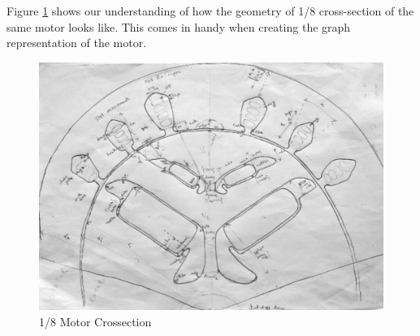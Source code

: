 \documentclass{report} %
\begin{document}
Figure \ref{fig:1/8 Motor Crossection} shows our understanding of how the geometry of 1/8 cross-section of the same motor looks like.
This comes in handy when creating the graph representation of the motor.\\

\begin{figure}[H]
    \centering
    \includegraphics[width=1\textwidth]{./ReportImages/EMCrosssectionFiltered.png} 
    \caption{1/8 Motor Crossection}
    \label{fig:1/8 Motor Crossection}
\end{figure}

\newpage 
\end{document}
